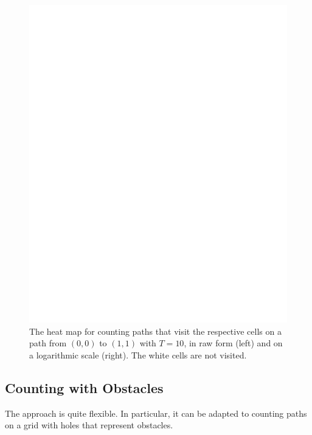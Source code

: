 \documentclass[11pt,a4paper,twoside,british]{article}
\begin{document}
\begin{figure}
\includegraphics{dummy.png}
\caption{The heat map for counting paths that visit the respective cells on a
path from $(0, 0)$ to $(1, 1)$ with $T = 10$, in raw form (left) and on a
logarithmic scale (right).
The white cells are not visited.}
\label{fig:visits_dp}
\end{figure}

\subsection{Counting with Obstacles}
The approach is quite flexible.
In particular, it can be adapted to counting paths on a grid with holes that
represent obstacles.
\end{document}
